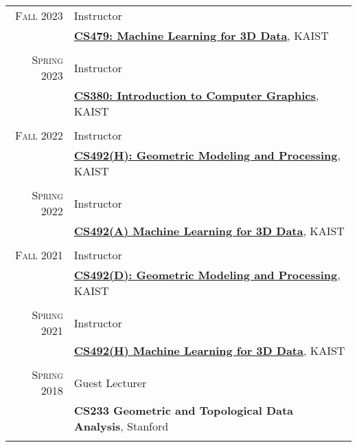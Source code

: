 \documentclass[letterpaper,10pt]{article} %
\begin{document}
{\begin{tabular}{r|p{11cm}}

\textsc{Fall 2023} & Instructor\\
& \href{https://mhsung.github.io/kaist-cs479-fall-2023/}{\textbf{CS479: Machine Learning for 3D Data}}, KAIST\\
& \\


\textsc{Spring 2023} & Instructor\\
& \href{https://mhsung.github.io/kaist-cs380-spring-2023/}{\textbf{CS380: Introduction to Computer Graphics}}, KAIST\\
& \\


\textsc{Fall 2022} & Instructor\\
& \href{https://mhsung.github.io/kaist-cs492h-fall-2022/}{\textbf{CS492(H): Geometric Modeling and Processing}}, KAIST\\
& \\


\textsc{Spring 2022} & Instructor\\
& \href{https://mhsung.github.io/kaist-cs492a-spring-2022/}{\textbf{CS492(A) Machine Learning for 3D Data}}, KAIST\\
& \\


\textsc{Fall 2021} & Instructor\\
& \href{https://mhsung.github.io/kaist-cs492d-fall-2021/}{\textbf{CS492(D): Geometric Modeling and Processing}}, KAIST\\
& \\


\textsc{Spring 2021} & Instructor\\
& \href{https://mhsung.github.io/courses/kaist-cs492h-spring-2021/}{\textbf{CS492(H) Machine Learning for 3D Data}}, KAIST\\
& \\


\textsc{Spring 2018} & Guest Lecturer\\
& \textbf{CS233 Geometric and Topological Data Analysis}, Stanford\\
& \\


\end{tabular}}
\end{document}
